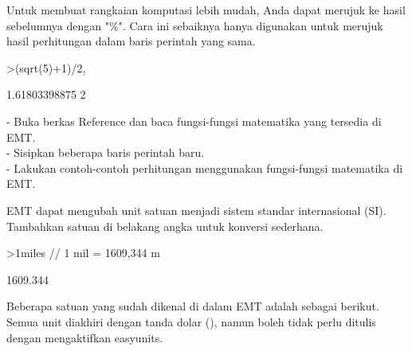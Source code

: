 \documentclass[a4paper,10pt]{article}
\begin{document}
\begin{eulernotebook}
\begin{eulercomment}
\begin{eulercomment}
\begin{eulercomment}
Untuk membuat rangkaian komputasi lebih mudah, Anda dapat merujuk ke hasil
sebelumnya dengan "\%". Cara ini sebaiknya hanya digunakan untuk merujuk hasil
perhitungan dalam baris perintah yang sama.
\end{eulercomment}
\begin{eulerprompt}
>(sqrt(5)+1)/2, %
\end{eulerprompt}
\begin{euleroutput}
  1.61803398875
  2
\end{euleroutput}
\begin{eulercomment}
- Buka berkas Reference dan baca fungsi-fungsi matematika yang tersedia di EMT.\\
- Sisipkan beberapa baris perintah baru.\\
- Lakukan contoh-contoh perhitungan menggunakan fungsi-fungsi matematika di EMT.\\
\end{eulercomment}
\eulersubheading{}
\begin{eulercomment}
\begin{eulercomment}
\begin{eulercomment}
EMT dapat mengubah unit satuan menjadi sistem standar internasional (SI).
Tambahkan satuan di belakang angka untuk konversi sederhana.
\end{eulercomment}
\begin{eulerprompt}
>1miles  // 1 mil = 1609,344 m
\end{eulerprompt}
\begin{euleroutput}
  1609.344
\end{euleroutput}
\begin{eulercomment}
Beberapa satuan yang sudah dikenal di dalam EMT adalah sebagai
berikut. Semua unit diakhiri dengan tanda dolar (\textdollar{}), namun boleh tidak
perlu ditulis dengan mengaktifkan easyunits. 


\end{eulercomment}
\end{eulercomment}
\end{eulercomment}
\end{eulercomment}
\end{eulercomment}
\end{eulernotebook}
\end{document}
